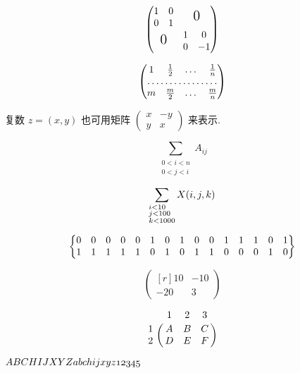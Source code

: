\documentclass{ctexart}
\begin{document}
\[
\begin{pmatrix}
\begin{matrix}1&0\\0&1\end{matrix} & \text{\Large 0} \\
\text{\Large 0} & \begin{matrix}1&0\\0&-1\end{matrix}
\end{pmatrix}
\]

\[
\begin{pmatrix}
  1 & \frac 12 & \dots & \frac 1n \\
  \hdotsfor{4} \\
  m & \frac m2 & \dots & \frac mn
\end{pmatrix}
\]

复数 $z = (x,y)$ 也可用矩阵 \begin{math}
  \left( \begin{smallmatrix}
    x & -y \\ y & x
  \end{smallmatrix} \right)
\end{math} 来表示.

\[
\sum_{\substack{0<i<n \\ 0<j<i}} A_{ij}
\]

\[
\sum_{\begin{subarray}{l}i<10 \\ j<100 \\ k<1000\end{subarray}} X(i,j,k)
\]

\[ \setcounter{MaxMatrixCols}{15}
\begin{Bmatrix}
0 & 0 & 0 & 0 & 0 & 1 & 0 & 1 & 0 & 0 & 1 & 1 & 1 & 0 & 1\\
1 & 1 & 1 & 1 & 1 & 0 & 1 & 0 & 1 & 1 & 0 & 0 & 0 & 1 & 0
\end{Bmatrix}
\]

\[
\begin{pmatrix*}[r]
  10 & -10 \\ -20 & 3
\end{pmatrix*}
\]

\[ \bordermatrix{
  & 1 & 2 & 3 \cr
1 & A & B & C \cr
2 & D & E & F \cr} \]


$\mathnormal{ABCHIJXYZabchijxyz12345}$
\end{document}
